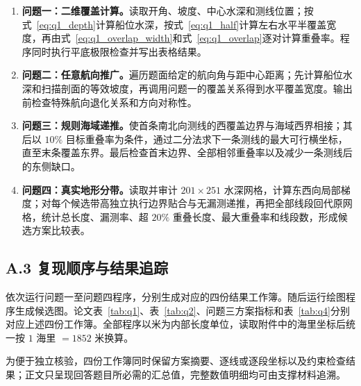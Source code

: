 \begin{enumerate}
  \item \textbf{问题一：二维覆盖计算。}读取开角、坡度、中心水深和测线位置；按式~\eqref{eq:q1_depth}计算船位水深，按式~\eqref{eq:q1_half}计算左右水平半覆盖宽度，再由式~\eqref{eq:q1_overlap_width}和式~\eqref{eq:q1_overlap}逐对计算重叠率。程序同时执行平底极限检查并写出表格结果。

  \item \textbf{问题二：任意航向推广。}遍历题面给定的航向角与距中心距离；先计算船位水深和扫描剖面的等效坡度，再调用问题一的覆盖关系得到水平覆盖宽度。输出前检查特殊航向退化关系和方向对称性。

  \item \textbf{问题三：规则海域递推。}使首条南北向测线的西覆盖边界与海域西界相接；其后以 $10\%$ 目标重叠率为条件，通过二分法求下一条测线的最大可行横坐标，直至末条覆盖东界。最后检查首末边界、全部相邻重叠率以及减少一条测线后的东侧缺口。

  \item \textbf{问题四：真实地形分带。}读取并审计 $201\times251$ 水深网格，计算东西向局部梯度；对每个候选带高独立执行边界贴合与无漏测递推，再把全部线段回代原网格，统计总长度、漏测率、超 $20\%$ 重叠长度、最大重叠率和线段数，形成候选方案比较表。
\end{enumerate}

\subsection*{A.3 复现顺序与结果追踪}

依次运行问题一至问题四程序，分别生成对应的四份结果工作簿。随后运行绘图程序生成候选图。论文表~\ref{tab:q1}、表~\ref{tab:q2}、问题三方案指标和表~\ref{tab:q4}分别对应上述四份工作簿。全部程序以米为内部长度单位，读取附件中的海里坐标后统一按 $1$ 海里 $=1852$ 米换算。

为便于独立核验，四份工作簿同时保留方案摘要、逐线或逐段坐标以及约束检查结果；正文只呈现回答题目所必需的汇总值，完整数值明细均可由支撑材料追溯。
